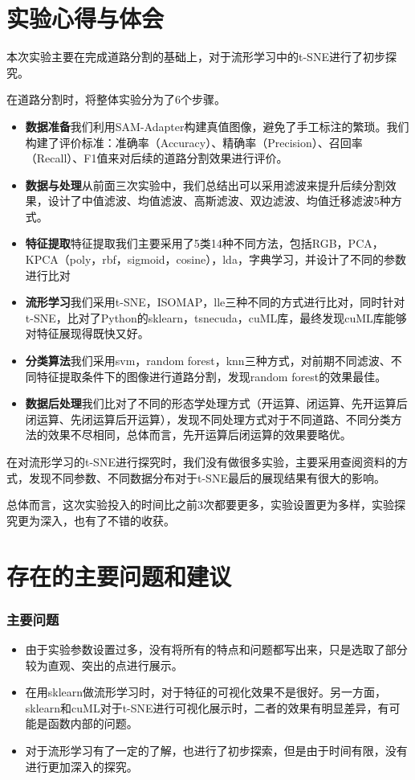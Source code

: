 \documentclass[12pt,hyperref,a4paper,UTF8]{ctexart}
\begin{document}
{{\section{实验心得与体会}
本次实验主要在完成道路分割的基础上，对于流形学习中的t-SNE进行了初步探究。
\par
在道路分割时，将整体实验分为了6个步骤。
\begin{itemize}
\item \textbf{数据准备}\quad 我们利用SAM-Adapter构建真值图像，避免了手工标注的繁琐。我们构建了评价标准：准确率（Accuracy）、精确率（Precision）、召回率（Recall）、F1值来对后续的道路分割效果进行评价。
\item \textbf{数据与处理}\quad 从前面三次实验中，我们总结出可以采用滤波来提升后续分割效果，设计了中值滤波、均值滤波、高斯滤波、双边滤波、均值迁移滤波5种方式。
\item \textbf{特征提取}\quad 特征提取我们主要采用了5类14种不同方法，包括RGB，PCA，KPCA（poly，rbf，sigmoid，cosine），lda，字典学习，并设计了不同的参数进行比对
\item \textbf{流形学习}\quad 我们采用t-SNE，ISOMAP，lle三种不同的方式进行比对，同时针对t-SNE，比对了Python的sklearn，tsnecuda，cuML库，最终发现cuML库能够对特征展现得既快又好。
\item \textbf{分类算法}\quad 我们采用svm，random forest，knn三种方式，对前期不同滤波、不同特征提取条件下的图像进行道路分割，发现random forest的效果最佳。
\item \textbf{数据后处理}\quad 我们比对了不同的形态学处理方式（开运算、闭运算、先开运算后闭运算、先闭运算后开运算），发现不同处理方式对于不同道路、不同分类方法的效果不尽相同，总体而言，先开运算后闭运算的效果要略优。
\end{itemize}

在对流形学习的t-SNE进行探究时，我们没有做很多实验，主要采用查阅资料的方式，发现不同参数、不同数据分布对于t-SNE最后的展现结果有很大的影响。

总体而言，这次实验投入的时间比之前3次都要更多，实验设置更为多样，实验探究更为深入，也有了不错的收获。

\section{存在的主要问题和建议}

\subsubsection{主要问题}
\begin{itemize}
    \item 由于实验参数设置过多，没有将所有的特点和问题都写出来，只是选取了部分较为直观、突出的点进行展示。
    \item 在用sklearn做流形学习时，对于特征的可视化效果不是很好。另一方面，sklearn和cuML对于t-SNE进行可视化展示时，二者的效果有明显差异，有可能是函数内部的问题。
    \item 对于流形学习有了一定的了解，也进行了初步探索，但是由于时间有限，没有进行更加深入的探究。
\end{itemize}

}}
\end{document}
